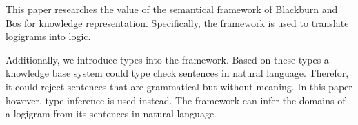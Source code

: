 This paper researches the value of the semantical framework of Blackburn and Bos for knowledge representation. Specifically, the framework is used to translate logigrams into logic. %

Additionally, we introduce types into the framework. Based on these types a knowledge base system could type check sentences in natural language. Therefor, it could reject sentences that are grammatical but without meaning. In this paper however, type inference is used instead. The framework can infer the domains of a logigram from its sentences in natural language.


